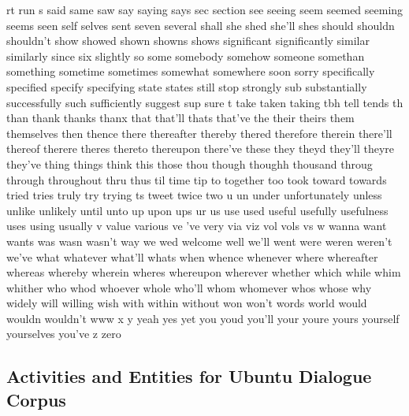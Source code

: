 \documentclass{article}
\begin{document}
\begin{framed}
rt run s said same saw say saying says sec section see seeing seem seemed seeming seems seen self selves sent seven several shall she shed she'll shes should shouldn shouldn't show showed shown showns shows significant significantly similar similarly since six slightly so some somebody somehow someone somethan something sometime sometimes somewhat somewhere soon sorry specifically specified specify specifying state states still stop strongly sub substantially successfully such sufficiently suggest sup sure t take taken taking tbh tell tends th than thank thanks thanx that that'll thats that've the their theirs them themselves then thence there thereafter thereby thered therefore therein there'll thereof therere theres thereto thereupon there've these they theyd they'll theyre they've thing things think this those thou though thoughh thousand throug through throughout thru thus til time tip to together too took toward towards tried tries truly try trying ts tweet twice two u un under unfortunately unless unlike unlikely until unto up upon ups ur us use used useful usefully usefulness uses using usually v value various ve 've very via viz vol vols vs w wanna want wants was wasn wasn't way we wed welcome well we'll went were weren weren't we've what whatever what'll whats when whence whenever where whereafter whereas whereby wherein wheres whereupon wherever whether which while whim whither who whod whoever whole who'll whom whomever whos whose why widely will willing wish with within without won won't words world would wouldn wouldn't www x y yeah yes yet you youd you'll your youre yours yourself yourselves you've z zero
\end{framed}


\subsection*{Activities and Entities for Ubuntu Dialogue Corpus} 
\end{document}
